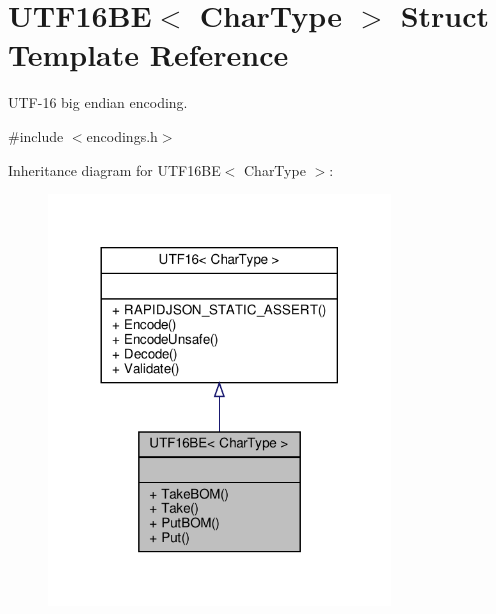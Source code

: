 \hypertarget{structUTF16BE}{}\section{U\+T\+F16\+BE$<$ Char\+Type $>$ Struct Template Reference}
\label{structUTF16BE}


U\+T\+F-\/16 big endian encoding.  




{\ttfamily \#include $<$encodings.\+h$>$}



Inheritance diagram for U\+T\+F16\+BE$<$ Char\+Type $>$\+:
\nopagebreak
\begin{figure}[H]
\begin{center}
\leavevmode
\includegraphics[width=257pt]{structUTF16BE__inherit__graph}
\end{center}
\end{figure}


